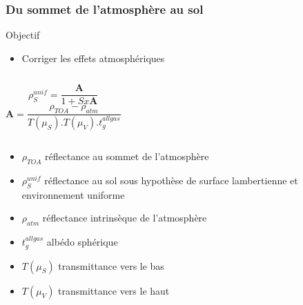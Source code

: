 \documentclass[compress]{beamer}
\begin{document}
\begin{frame}

  \frametitle{Du sommet de l'atmosphère au sol}

  \begin{block}{Objectif}
   \begin{itemize}
    \item Corriger les effets atmosphériques
   \end{itemize}
  \end{block}
 
  
  \begin{columns}
  \footnotesize
  \begin{equation*}
   \rho_{S}^{unif} = \frac{ \mathbf{A} }{ 1 + Sx\mathbf{A} }
  \end{equation*}
  \begin{equation*}
   \mathbf{A} = \frac{ \rho_{TOA} - \rho_{atm} }{ T(\mu_{S}).T(\mu_{V}).t_{g}^{all gas} }
  \end{equation*}
  \end{columns}
  \begin{itemize}
  \item $\rho_{TOA}$ réflectance au sommet de l'atmosphère
  \item $\rho_{S}^{unif}$ réflectance au sol sous hypothèse de surface
    lambertienne et environnement uniforme
  \item $\rho_{atm}$ réflectance intrinsèque de l'atmosphère
  \item $t_{g}^{all gas}$ albédo sphérique
  \item $T(\mu_{S})$ transmittance vers le bas
  \item $T(\mu_{V})$ transmittance vers le haut
  \end{itemize}
\end{frame}
\end{document}
